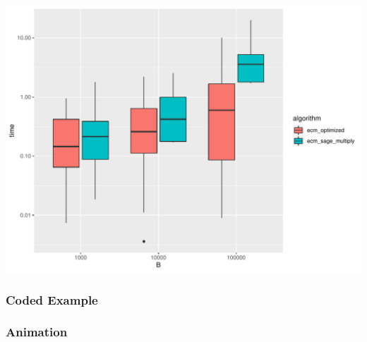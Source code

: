 \documentclass{beamer}
\begin{document}
\begin{frame}

\includegraphics[width=\textwidth]{graphs/ecm_perf.pdf}

\end{frame}

\begin{frame}
\frametitle{Coded Example}



\end{frame}

\begin{frame}
\frametitle{Animation}

\end{frame}
\end{document}
